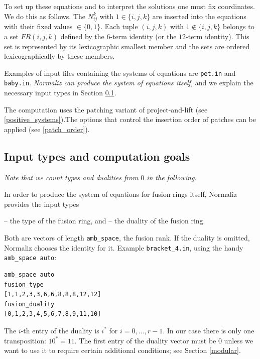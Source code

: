 To set up these equations and to interpret the solutions one must fix coordinates. We do this as follows.  The $N_{ij}^k$ with $1\in \{i,j,k\}$ are inserted into the equations with their fixed values $\in \{0,1\}$. Each tuple $(i,j,k)$ with $1\notin \{i,j,k\}$ belongs to a set $FR(i,j,k)$ defined by the $6$-term identity (or the $12$-term identity). This set is represented by its lexicographic smallest member and the sets are ordered lexicographically by these members.

Examples of input files containing the systems of equations are \verb*|pet.in| and \verb*|baby.in|. \emph{Normaliz can produce the system of equations itself,} and we explain the necessary input types in Section \ref{fusion_input}.

The computation uses the patching variant of project-and-lift (see \ref{positive_systems}).The options that control the insertion order of patches can be applied (see \ref{patch_order}).

\subsection{Input types and computation goals}\label{fusion_input}

\emph{Note that we count types and dualities from $0$ in the following.}

In order to  produce the system of equations for fusion rings itself, Normaliz provides the input types
\begin{itemize}
	 -- the type of the fusion ring, and
	 -- the duality of the fusion ring.
\end{itemize}

Both are vectors of length \verb*|amb_space|, the fusion rank. If the duality is omitted, Normaliz chooses the identity for it. Example \verb*|bracket_4.in|, using the handy \verb*|amb_space auto|:
\begin{Verbatim}
amb_space auto
fusion_type
[1,1,2,3,3,6,6,8,8,8,12,12]
fusion_duality
[0,1,2,3,4,5,6,7,8,9,11,10]
\end{Verbatim}
The $i$-th entry of the duality is $i^*$ for $i=0,...,r-1$. In our case there is only one transposition: $10^*= 11$. The first entry of the duality vector must be $0$ unless we want to use it to require certain additional conditions; see Section \ref{modular}.

